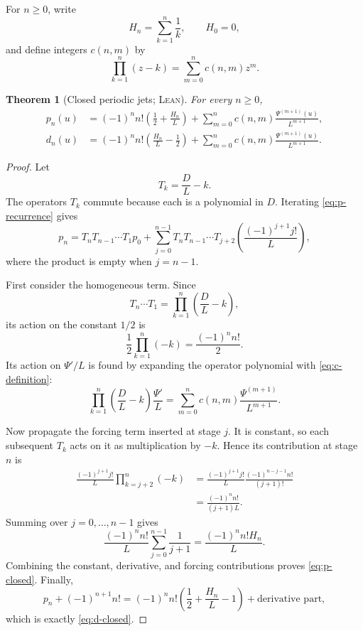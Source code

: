 \documentclass[11pt,oneside]{article}
\newtheorem{theorem}{Theorem}[section]
\theoremstyle{definition}
\theoremstyle{remark}
\newcommand{\Formalized}{\textsc{Lean}}
\begin{document}
For $n\geq0$, write
\[
 H_n=\sum_{k=1}^n\frac1k,\qquad H_0=0,
\]
and define integers $c(n,m)$ by
\begin{equation}
 \prod_{k=1}^n(z-k)=\sum_{m=0}^n c(n,m)z^m.
 \label{eq:c-definition}
\end{equation}

\begin{theorem}[Closed periodic jets; \Formalized]
\label{thm:closed-jets}
For every $n\geq0$,
\begin{align}
 p_n(u)
 &=
 (-1)^n n!\left(\frac12+\frac{H_n}{L}\right)
 +\sum_{m=0}^n
   c(n,m)\frac{\Psi^{(m+1)}(u)}{L^{m+1}},
 \label{eq:p-closed}\\
 d_n(u)
 &=
 (-1)^n n!\left(\frac{H_n}{L}-\frac12\right)
 +\sum_{m=0}^n
   c(n,m)\frac{\Psi^{(m+1)}(u)}{L^{m+1}}.
 \label{eq:d-closed}
\end{align}
\end{theorem}

\begin{proof}
Let
\[
 T_k=\frac DL-k.
\]
The operators $T_k$ commute because each is a polynomial in $D$.  Iterating
\eqref{eq:p-recurrence} gives
\begin{equation}
 p_n=T_nT_{n-1}\cdots T_1p_0
 +\sum_{j=0}^{n-1}
   T_nT_{n-1}\cdots T_{j+2}
   \left(\frac{(-1)^{j+1}j!}{L}\right),
 \label{eq:p-iteration}
\end{equation}
where the product is empty when $j=n-1$.

First consider the homogeneous term.  Since
\[
 T_n\cdots T_1
 =\prod_{k=1}^n\left(\frac DL-k\right),
\]
its action on the constant $1/2$ is
\[
 \frac12\prod_{k=1}^n(-k)=\frac{(-1)^nn!}{2}.
\]
Its action on $\Psi'/L$ is found by expanding the operator polynomial with
\eqref{eq:c-definition}:
\[
 \prod_{k=1}^n\left(\frac DL-k\right)\frac{\Psi'}L
 =\sum_{m=0}^n
   c(n,m)\frac{\Psi^{(m+1)}}{L^{m+1}}.
\]

Now propagate the forcing term inserted at stage $j$.  It is constant, so
each subsequent $T_k$ acts on it as multiplication by $-k$.  Hence its
contribution at stage $n$ is
\begin{align*}
 \frac{(-1)^{j+1}j!}{L}
 \prod_{k=j+2}^n(-k)
 &=
 \frac{(-1)^{j+1}j!}{L}
 \frac{(-1)^{n-j-1}n!}{(j+1)!}\\
 &=\frac{(-1)^nn!}{(j+1)L}.
\end{align*}
Summing over $j=0,\dots,n-1$ gives
\[
 \frac{(-1)^nn!}{L}\sum_{j=0}^{n-1}\frac1{j+1}
 =\frac{(-1)^nn!H_n}{L}.
\]
Combining the constant, derivative, and forcing contributions proves
\eqref{eq:p-closed}.  Finally,
\[
 p_n+(-1)^{n+1}n!
 =(-1)^nn!\left(\frac12+\frac{H_n}{L}-1\right)
   +\text{derivative part},
\]
which is exactly \eqref{eq:d-closed}.
\end{proof}
\end{document}
